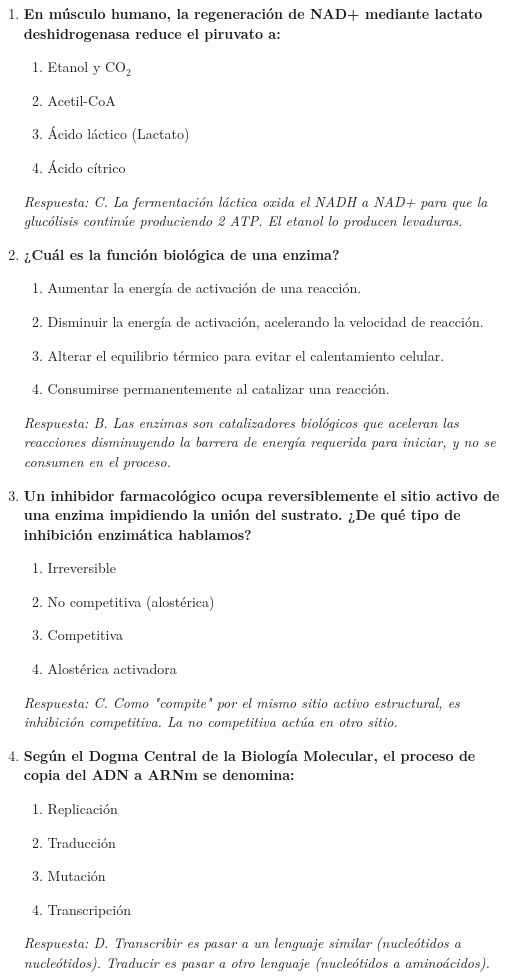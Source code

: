 \begin{enumerate}[label=\textbf{\arabic*.}]
    \item \textbf{En músculo humano, la regeneración de NAD+ mediante lactato deshidrogenasa reduce el piruvato a:}
    \begin{enumerate}
        \item[A)] Etanol y $\mathrm{CO}_{2}$
        \item[B)] Acetil-CoA
        \item[C)] Ácido láctico (Lactato)
        \item[D)] Ácido cítrico
    \end{enumerate}
    \textit{Respuesta: C. La fermentación láctica oxida el NADH a NAD+ para que la glucólisis continúe produciendo 2 ATP. El etanol lo producen levaduras.}

    \item \textbf{¿Cuál es la función biológica de una enzima?}
    \begin{enumerate}
        \item[A)] Aumentar la energía de activación de una reacción.
        \item[B)] Disminuir la energía de activación, acelerando la velocidad de reacción.
        \item[C)] Alterar el equilibrio térmico para evitar el calentamiento celular.
        \item[D)] Consumirse permanentemente al catalizar una reacción.
    \end{enumerate}
    \textit{Respuesta: B. Las enzimas son catalizadores biológicos que aceleran las reacciones disminuyendo la barrera de energía requerida para iniciar, y no se consumen en el proceso.}

    \item \textbf{Un inhibidor farmacológico ocupa reversiblemente el sitio activo de una enzima impidiendo la unión del sustrato. ¿De qué tipo de inhibición enzimática hablamos?}
    \begin{enumerate}
        \item[A)] Irreversible
        \item[B)] No competitiva (alostérica)
        \item[C)] Competitiva
        \item[D)] Alostérica activadora
    \end{enumerate}
    \textit{Respuesta: C. Como "compite" por el mismo sitio activo estructural, es inhibición competitiva. La no competitiva actúa en otro sitio.}

    \item \textbf{Según el Dogma Central de la Biología Molecular, el proceso de copia del ADN a ARNm se denomina:}
    \begin{enumerate}
        \item[A)] Replicación
        \item[B)] Traducción
        \item[C)] Mutación
        \item[D)] Transcripción
    \end{enumerate}
    \textit{Respuesta: D. Transcribir es pasar a un lenguaje similar (nucleótidos a nucleótidos). Traducir es pasar a otro lenguaje (nucleótidos a aminoácidos).}


\end{enumerate}
